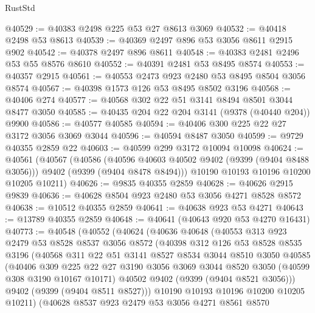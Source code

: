 \begin{lexlean}{RustStd}
\begin{coremodule}
@40529 := @40383 @2498 @225 @53 @27 @8613 @3069
@40532 := @40418 @2498 @53 @8613
@40539 := @40369 @2497 @896 @53 @3056 @8611 @2915 @902
@40542 := @40378 @2497 @896 @8611
@40548 := @40383 @2481 @2496 @53 @55 @8576 @8610
@40552 := @40391 @2481 @53 @8495 @8574
@40553 := @40357 @2915
@40561 := @40553 @2473 @923 @2480 @53 @8495 @8504 @3056 @8574
@40567 := @40398 @1573 @126 @53 @8495 @8502 @3196
@40568 := @40406 @274
@40577 := @40568 @302 @22 @51 @3141 @8494 @8501 @3044 @8477 @3050
@40585 := @40435 @204 @22 @204 @3141 (@9378 (@40440 @204)) @9900
@40586 := @40577 @40585
@40594 := @40406 @300 @225 @22 @27 @3172 @3056 @3069 @3044
@40596 := @40594 @8487 @3050
@40599 := @9729 @40355 @2859 @22
@40603 := @40599 @299 @3172 @10094 @10098
@40624 := @40561
    (@40567
      (@40586
        (@40596 @40603 @40502 @9402 (@9399 (@9404 @8488 @3056)))
        @9402
        (@9399 (@9404 @8478 @8494)))
      @10190
      @10193
      @10196
      @10200
      @10205
      @10211)
@40626 := @9835 @40355 @2859
@40628 := @40626 @2915 @9839
@40636 := @40628 @8504 @923 @2480 @53 @3056 @4271 @8528 @8572
@40638 := @10512 @40355 @2859
@40641 := @40638 @923 @53 @4271
@40643 := @13789 @40355 @2859
@40648 := @40641 (@40643 @920 @53 @4270 @16431)
@40773 := @40548
    (@40552
      (@40624
        (@40636
          @40648
          (@40553
            @313
            @923
            @2479
            @53
            @8528
            @8537
            @3056
            @8572
            (@40398
              @312
              @126
              @53
              @8528
              @8535
              @3196
              (@40568
                @311
                @22
                @51
                @3141
                @8527
                @8534
                @3044
                @8510
                @3050
                @40585
                (@40406
                  @309
                  @225
                  @22
                  @27
                  @3190
                  @3056
                  @3069
                  @3044
                  @8520
                  @3050
                  (@40599 @308 @3190 @10167 @10171)
                  @40502
                  @9402
                  (@9399 (@9404 @8521 @3056)))
                @9402
                (@9399 (@9404 @8511 @8527)))
              @10190
              @10193
              @10196
              @10200
              @10205
              @10211)
            (@40628
              @8537
              @923
              @2479
              @53
              @3056
              @4271
              @8561
              @8570

\end{coremodule}
\end{lexlean}
